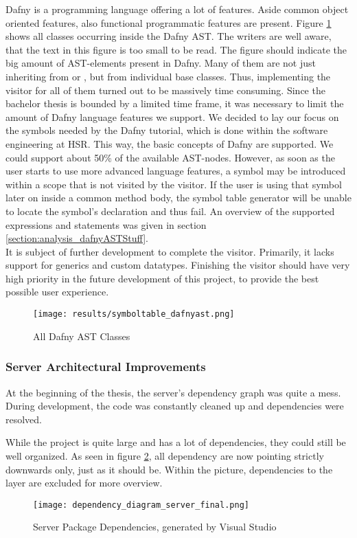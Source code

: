 Dafny is a programming language offering a lot of features.
Aside common object oriented features, also functional programmatic features are present.
Figure \ref{fig:dafnyASTOverview_3} shows all classes occurring inside the Dafny AST.
The writers are well aware, that the text in this figure is too small to be read.
The figure should indicate the big amount of AST-elements present in Dafny.
Many of them are not just inheriting from  or , but from individual base classes.
Thus, implementing the visitor for all of them turned out to be massively time consuming.
Since the bachelor thesis is bounded by a limited time frame, it was necessary to limit the amount of Dafny language features we support.
We decided to lay our focus on the symbols needed by the Dafny tutorial, which is done within the software engineering at HSR.
This way, the basic concepts of Dafny are supported.
We could support about 50\% of the available AST-nodes.
However, as soon as the user starts to use more advanced language features, a symbol may be introduced within a scope that is not visited by the visitor.
If the user is using that symbol later on inside a common method body, the symbol table generator will be unable to locate the symbol's declaration and thus fail.
An overview of the supported expressions and statements was given in section \ref{section:analysis_dafnyASTStuff}.\\

It is subject of further development to complete the visitor.
Primarily, it lacks support for generics and custom datatypes.
Finishing the visitor should have very high priority in the future development of this project,
to provide the best possible user experience.

\begin{figure}[H]
    \centering
    \texttt{[image: results/symboltable\_dafnyast.png]}
    \caption{All Dafny AST Classes}
    \label{fig:dafnyASTOverview_3}
\end{figure}

\subsubsection{Server Architectural Improvements}
At the beginning of the thesis, the server's dependency graph was quite a mess.
During development, the code was constantly cleaned up and dependencies were resolved.

While the project is quite large and has a lot of dependencies, they could still be well organized.
As seen in figure \ref{fig:dependency_graph_2}, all dependency are now pointing strictly downwards only, just as it should be.
Within the picture, dependencies to the  layer are excluded for more overview.
\begin{figure}[H]
    \centering
    \texttt{[image: dependency\_diagram\_server\_final.png]}
    \caption{Server Package Dependencies, generated by Visual Studio}
    \label{fig:dependency_graph_2}
\end{figure}

